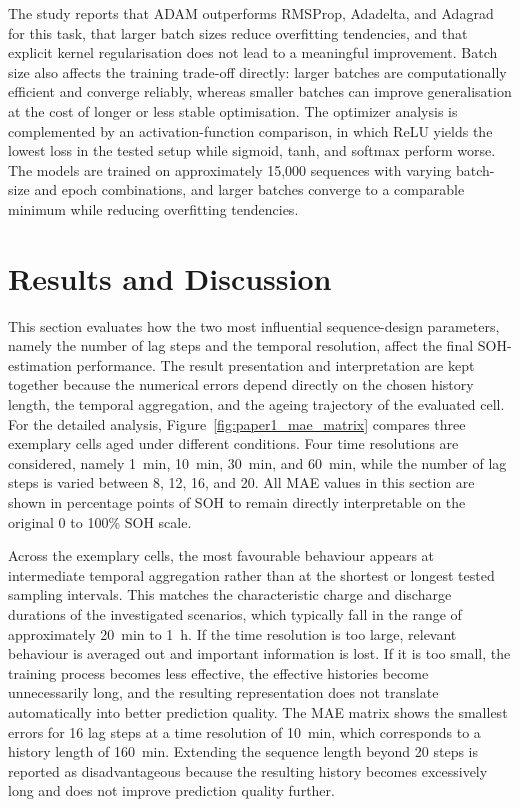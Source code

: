 \documentclass[
    a4paper,
    12pt,
    titlepage,
    bibliography=totoc,
    twoside=on,
    parskip=false,
    numbers=noenddot,
    cleardoublepage=empty,
    DIV=12,
    BCOR=12.0mm,
    headheight=36pt,
    headings=openright
]{scrreprt}
\begin{document}
The study reports that ADAM outperforms RMSProp, Adadelta, and Adagrad for this task, that larger batch sizes reduce overfitting tendencies, and that explicit kernel regularisation does not lead to a meaningful improvement. Batch size also affects the training trade-off directly: larger batches are computationally efficient and converge reliably, whereas smaller batches can improve generalisation at the cost of longer or less stable optimisation. The optimizer analysis is complemented by an activation-function comparison, in which ReLU yields the lowest loss in the tested setup while sigmoid, tanh, and softmax perform worse. The models are trained on approximately 15{,}000 sequences with varying batch-size and epoch combinations, and larger batches converge to a comparable minimum while reducing overfitting tendencies.

\section{Results and Discussion}
\label{sec:paper1_results}
This section evaluates how the two most influential sequence-design parameters, namely the number of lag steps and the temporal resolution, affect the final SOH-estimation performance. The result presentation and interpretation are kept together because the numerical errors depend directly on the chosen history length, the temporal aggregation, and the ageing trajectory of the evaluated cell. For the detailed analysis, Figure~\ref{fig:paper1_mae_matrix} compares three exemplary cells aged under different conditions. Four time resolutions are considered, namely \SI{1}{\minute}, \SI{10}{\minute}, \SI{30}{\minute}, and \SI{60}{\minute}, while the number of lag steps is varied between 8, 12, 16, and 20. All MAE values in this section are shown in percentage points of SOH to remain directly interpretable on the original 0 to 100\% SOH scale.

Across the exemplary cells, the most favourable behaviour appears at intermediate temporal aggregation rather than at the shortest or longest tested sampling intervals. This matches the characteristic charge and discharge durations of the investigated scenarios, which typically fall in the range of approximately \SI{20}{\minute} to \SI{1}{\hour}. If the time resolution is too large, relevant behaviour is averaged out and important information is lost. If it is too small, the training process becomes less effective, the effective histories become unnecessarily long, and the resulting representation does not translate automatically into better prediction quality. The MAE matrix shows the smallest errors for 16 lag steps at a time resolution of \SI{10}{\minute}, which corresponds to a history length of \SI{160}{\minute}. Extending the sequence length beyond 20 steps is reported as disadvantageous because the resulting history becomes excessively long and does not improve prediction quality further.
\end{document}
